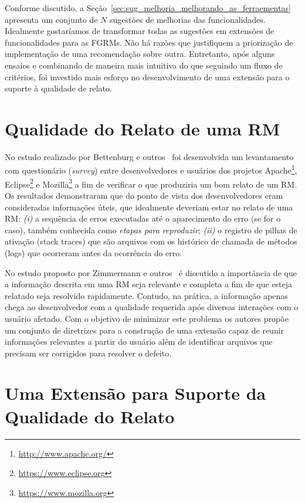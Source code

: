 Conforme discutido, a Seção~\ref{sec:sug_melhoria_melhorando_as_ferraementas}
apresenta um conjunto de $N$ sugestões de melhorias das funcionalidades.
Idealmente gostaríamos de transformar todas as sugestões em extensões de
funcionalidades para as FGRMs. Não há razões que justifiquem a priorização de
implementação de uma recomendação sobre outra. Entretanto, após alguns ensaios e
combinando de maneira mais intuitiva do que seguindo um fluxo de critérios,  foi
investido mais esforço no desenvolvimento de uma extensão para o suporte à
qualidade de relato.

\section{Qualidade do Relato de uma RM}
\label{sec:avaliando_a_qualidade_do_relato_de_uma_rm}

No estudo realizado por Bettenburg e outros~\cite{bettenburg2008makes} foi
desenvolvida um levantamento com questionário (\textit{survey}) entre
desenvolvedores e usuários dos projetos
Apache\footnote{\url{http://www.apache.org/}},
Eclipse\footnote{\url{https://www.eclipse.org}} e
Mozilla\footnote{\url{https://www.mozilla.org}} a fim de verificar o que
produziria um bom relato de um RM\@. Os resultados demonstraram que do ponto de
vista dos desenvolvedores eram consideradas informações úteis, que idealmente
deveriam estar no relato de uma RM\@: \textit{(i)} a sequência de erros
executadas até o aparecimento do erro (se for o caso), também conhecida como
\textit{etapas para reproduzir}; \textit{(ii)} o registro de pilhas de ativação
(stack traces) que são arquivos com os histórico de chamada de métodos (logs)
que ocorreram antes da ocorrência do erro.

No estudo proposto por Zimmermann e outros~\cite{5070993} é discutido a
importância de que a informação descrita em uma RM seja relevante e completa a
fim de que esteja relatado seja resolvido rapidamente. Contudo, na prática, a
informação apenas chega ao desenvolvedor com a qualidade requerida após diversas
interações com o usuário afetado. Com o objetivo de minimizar este problema os
autores propõe um conjunto de diretrizes para a construção de uma extensão capaz
de reunir informações relevantes a partir do usuário além de identificar
arquivos que precisam ser corrigidos para resolver o defeito.

\section{Uma Extensão para Suporte da Qualidade do Relato}
\label{sec:uma_extensao_suporte_qualidade_relato}

